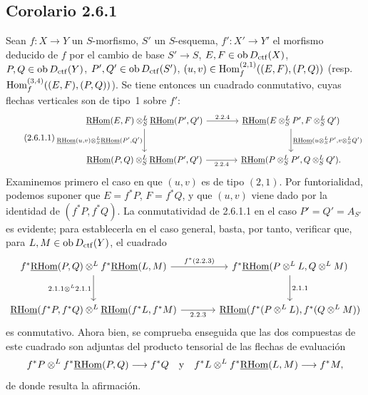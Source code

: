 \subsection*{Corolario 2.6.1}
Sean $f:X\to Y$ un $S$-morfismo, $S'$ un $S$-esquema, $f':X'\to Y'$ el morfismo deducido de $f$ por el cambio de base $S'\to S$, $E,F\in\operatorname{ob} D_{\mathrm{ctf}}(X)$, $P,Q\in\operatorname{ob} D_{\mathrm{ctf}}(Y)$, $P',Q'\in\operatorname{ob} D_{\mathrm{ctf}}(S')$, $(u,v)\in\operatorname{Hom}_f^{(2,1)}((E,F),(P,Q))$ (resp. $\operatorname{Hom}_f^{(3,4)}((E,F),(P,Q))$). Se tiene entonces un cuadrado conmutativo, cuyas flechas verticales son de tipo~1 sobre $f'$:
\begin{equation}\tag{2.6.1.1}
\begin{tikzcd}[column sep=large,row sep=large]
\uRHom(E,F)\otimes^L_S\uRHom(P',Q') \arrow[r,"2.2.4"] \arrow[d,"{\uRHom(u,v)\otimes^L_S\uRHom(P',Q')}"'] & \uRHom(E\otimes^L_SP',F\otimes^L_SQ') \arrow[d,"{\uRHom(u\otimes^L_SP',v\otimes^L_SQ')}"]\\
\uRHom(P,Q)\otimes^L_S\uRHom(P',Q') \arrow[r,"2.2.4"'] & \uRHom(P\otimes^L_SP',Q\otimes^L_SQ').
\end{tikzcd}
\end{equation}
Examinemos primero el caso en que $(u,v)$ es de tipo $(2,1)$. Por funtorialidad, podemos suponer que $E=f^{*}P$, $F=f^{*}Q$, y que $(u,v)$ viene dado por la identidad de $(f^{*}P,f^{*}Q)$. La conmutatividad de 2.6.1.1 en el caso $P'=Q'=A_{S'}$ es evidente; para establecerla en el caso general, basta, por tanto, verificar que, para $L,M\in\operatorname{ob} D_{\mathrm{ctf}}(Y)$, el cuadrado
\[
\begin{tikzcd}[column sep=large,row sep=large]
f^{*}\uRHom(P,Q)\otimes^L f^{*}\uRHom(L,M) \arrow[r,"{f^*(2.2.3)}"] \arrow[d,"{2.1.1\otimes^L 2.1.1}"'] & f^{*}\uRHom(P\otimes^LL,Q\otimes^LM) \arrow[d,"2.1.1"]\\
\uRHom(f^{*}P,f^{*}Q)\otimes^L\uRHom(f^{*}L,f^{*}M) \arrow[r,"2.2.3"'] & \uRHom(f^{*}(P\otimes^LL),f^{*}(Q\otimes^LM))
\end{tikzcd}
\]
es conmutativo. Ahora bien, se comprueba enseguida que las dos compuestas de este cuadrado son adjuntas del producto tensorial de las flechas de evaluación
\[
f^{*}P\otimes^L f^{*}\underline{\mathrm{RHom}}(P,Q)\longrightarrow f^{*}Q
\quad\text{y}\quad
f^{*}L\otimes^L f^{*}\underline{\mathrm{RHom}}(L,M)\longrightarrow f^{*}M,
\]
de donde resulta la afirmación.

